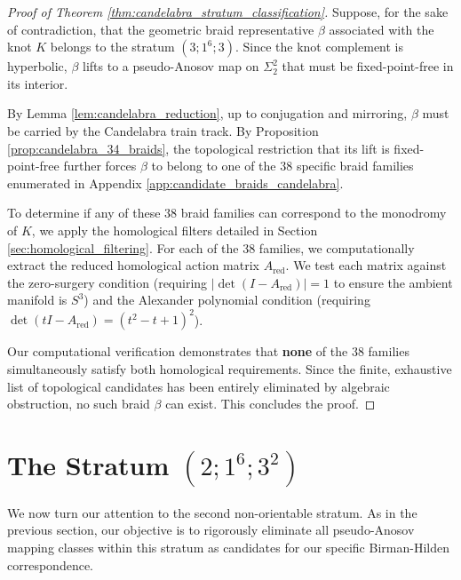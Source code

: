 \begin{proof}[Proof of Theorem \ref{thm:candelabra_stratum_classification}]
    Suppose, for the sake of contradiction, that the geometric braid representative $\beta$ associated with the knot $K$ belongs to the stratum $(3;1^6;3)$. Since the knot complement is hyperbolic, $\beta$ lifts to a pseudo-Anosov map on $\Sigma_2^2$ that must be fixed-point-free in its interior.

    By Lemma \ref{lem:candelabra_reduction}, up to conjugation and mirroring, $\beta$ must be carried by the Candelabra train track. By Proposition \ref{prop:candelabra_34_braids}, the topological restriction that its lift is fixed-point-free further forces $\beta$ to belong to one of the $38$ specific braid families enumerated in Appendix \ref{app:candidate_braids_candelabra}.

    To determine if any of these $38$ braid families can correspond to the monodromy of $K$, we apply the homological filters detailed in Section \ref{sec:homological_filtering}. For each of the $38$ families, we computationally extract the reduced homological action matrix $A_{\text{red}}$. We test each matrix against the zero-surgery condition (requiring $|\det(I - A_{\text{red}})| = 1$ to ensure the ambient manifold is $S^3$) and the Alexander polynomial condition (requiring $\det(tI - A_{\text{red}}) = (t^2-t+1)^2$).

    Our computational verification demonstrates that \textbf{none} of the $38$ families simultaneously satisfy both homological requirements. Since the finite, exhaustive list of topological candidates has been entirely eliminated by algebraic obstruction, no such braid $\beta$ can exist. This concludes the proof.
\end{proof}


\section{The Stratum \texorpdfstring{$(2;1^6;3^2)$}{(2;1\textasciicircum 6;3\textasciicircum 2)}}
\label{sec:analysis_2_16_32}

We now turn our attention to the second non-orientable stratum. As in the previous section, our objective is to rigorously eliminate all pseudo-Anosov mapping classes within this stratum as candidates for our specific Birman-Hilden correspondence.

